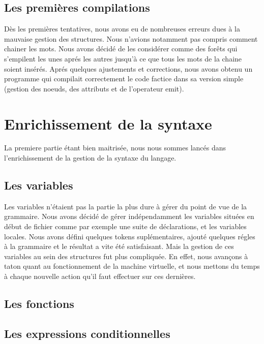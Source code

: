\documentclass[12pt]{article}
\begin{document}
\subsection{Les premières compilations}

Dès les premières tentatives, nous avons eu de nombreuses erreurs dues à la mauvaise
gestion des structures. Nous n'avions notamment pas compris comment chainer
les mots. Nous avons décidé de les considérer comme des forêts qui s'empilent les
unes aprés les autres jusqu'à ce que tous les mots de la chaine soient insérés.
Aprés quelques ajustements et corrections, nous avons obtenu un programme qui
compilait correctement le code factice dans sa version simple (gestion des noeuds,
des attributs et de l'operateur emit).

\newpage


\section{Enrichissement de la syntaxe}

La premiere partie étant bien maitrisée, nous nous sommes lancés dans l'enrichissement
de la gestion de la syntaxe du langage.

\subsection{Les variables}

Les variables n'étaient pas la partie la plus dure à gérer du point de vue de
la grammaire. Nous avons décidé de gérer indépendamment les variables situées
en début de fichier comme par exemple une suite de déclarations, et les variables locales.
Nous avons défini quelques tokens suplémentaires, ajouté quelques régles à la
grammaire et le résultat a vite été satisfaisant.
\newline
Mais la gestion de ces variables au sein des structures fut plus compliquée.
En effet, nous avançons à taton quant au fonctionnement de la machine virtuelle, et
nous mettons du temps à chaque nouvelle action qu'il faut effectuer sur ces
dernières.

\subsection{Les fonctions}


\subsection{Les expressions conditionnelles}
\end{document}
